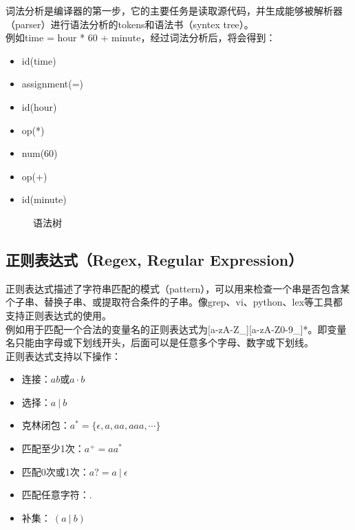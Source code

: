 词法分析是编译器的第一步，它的主要任务是读取源代码，并生成能够被解析器（parser）进行语法分析的tokens和语法书（syntex tree）。\\

例如time = hour * 60 + minute，经过词法分析后，将会得到：

\begin{itemize}
	\item id(time)
	\item assignment(=)
	\item id(hour)
	\item op(*)
	\item num(60)
	\item op(+)
	\item id(minute)
\end{itemize}

\begin{figure}[H]
	\centering
	\caption{语法树}
\end{figure}

\vspace{0.5cm}

\subsection{正则表达式（Regex, Regular Expression）}

正则表达式描述了字符串匹配的模式（pattern），可以用来检查一个串是否包含某个子串、替换子串、或提取符合条件的子串。像grep、vi、python、lex等工具都支持正则表达式的使用。\\

例如用于匹配一个合法的变量名的正则表达式为[a-zA-Z\_][a-zA-Z0-9\_]*。即变量名只能由字母或下划线开头，后面可以是任意多个字母、数字或下划线。\\

正则表达式支持以下操作：

\begin{itemize}
	\item 连接：$ ab $或$ a \cdot b $
	\item 选择：$ a\ |\ b $
	\item 克林闭包：$ a^* = \{\epsilon, a, aa, aaa, \cdots\} $
	\item 匹配至少1次：$ a^+ = aa^* $
	\item 匹配0次或1次：$ a? = a\ |\ \epsilon $
	\item 匹配任意字符：$ . $
	\item 补集：$ ~(a\ |\ b) $
\end{itemize}

